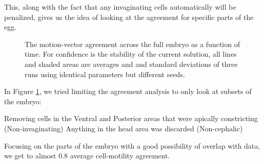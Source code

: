 This, along with the fact that any invaginating cells automatically will be penalized, gives us the idea of looking at the agreement for specific parts of the egg.



\begin{figure}[H]
    \centering
    \caption{The motion-vector agreement across the full embryo as a function of time. For confidence is the stability of the current solution, all lines and shaded areas are averages and and standard deviations of three runs using identical parameters but different seeds. }
    \label{fig:vector-subsets}
\end{figure}

In Figure \ref{fig:vector-subsets}, we tried limiting the agreement analysis to only look at subsets of the embryo:

Removing cells in the Ventral and Posterior areas that were apically constricting (Non-invaginating)
Anything in the head area was discarded (Non-cephalic)

Focusing on the parts of the embryo with a good possibility of overlap with data, we get to almost 0.8 average cell-motility agreement.  



